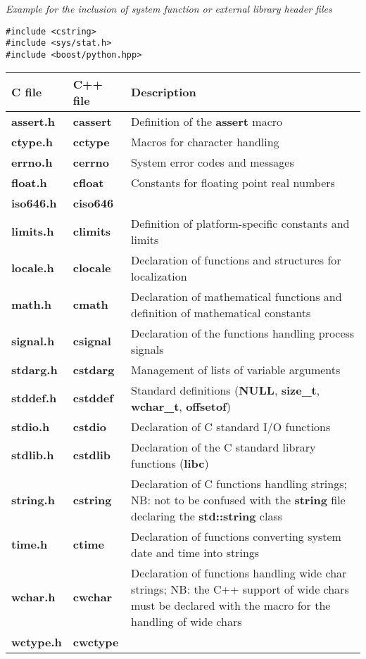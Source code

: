 \emph{Example for the inclusion of system function or external library header files}
\lstset{language=C++, basicstyle=\normalsize}
\begin{lstlisting}[frame=TBRL]
#include <cstring>
#include <sys/stat.h>
#include <boost/python.hpp>
\end{lstlisting}


\begin{tabular}{|l|l|p{12cm}|}
\hline \textbf{C file} & \textbf{C++ file} & \textbf{Description} \\
\hline {\bf assert.h} & {\bf cassert} & Definition of the {\bf assert} macro \\
\hline {\bf ctype.h} & {\bf cctype} & Macros for character handling \\
\hline {\bf errno.h} & {\bf cerrno} & System error codes and messages \\
\hline {\bf float.h} & {\bf cfloat} & Constants for floating point real numbers \\
\hline {\bf iso646.h} & {\bf ciso646} &  \\
\hline {\bf limits.h} & {\bf climits} & Definition of platform-specific constants and limits \\
\hline {\bf locale.h} & {\bf clocale} & Declaration of functions and structures for localization \\
\hline {\bf math.h} & {\bf cmath} & Declaration of mathematical functions and definition of mathematical constants \\
\hline {\bf signal.h} & {\bf csignal} & Declaration of the functions handling process signals \\
\hline {\bf stdarg.h} & {\bf cstdarg} & Management of lists of variable arguments \\
\hline {\bf stddef.h} & {\bf cstddef} & Standard definitions ({\bf NULL}, {\bf size\_t}, {\bf wchar\_t}, {\bf offsetof}) \\
\hline {\bf stdio.h} & {\bf cstdio} & Declaration of C standard I/O functions \\
\hline {\bf stdlib.h} & {\bf cstdlib} & Declaration of the C standard library functions ({\bf libc}) \\
\hline {\bf string.h} & {\bf cstring} & Declaration of C functions handling strings; NB: not to be confused with the {\bf string} file declaring the {\bf std::string} class \\
\hline {\bf time.h} & {\bf ctime} & Declaration of functions converting system date and time into strings \\
\hline {\bf wchar.h} & {\bf cwchar} & Declaration of functions handling wide char strings; NB: the C++ support of wide chars must be declared with the macro for the handling of wide chars \\
\hline {\bf wctype.h} & {\bf cwctype} & \\
\hline
\end{tabular}

